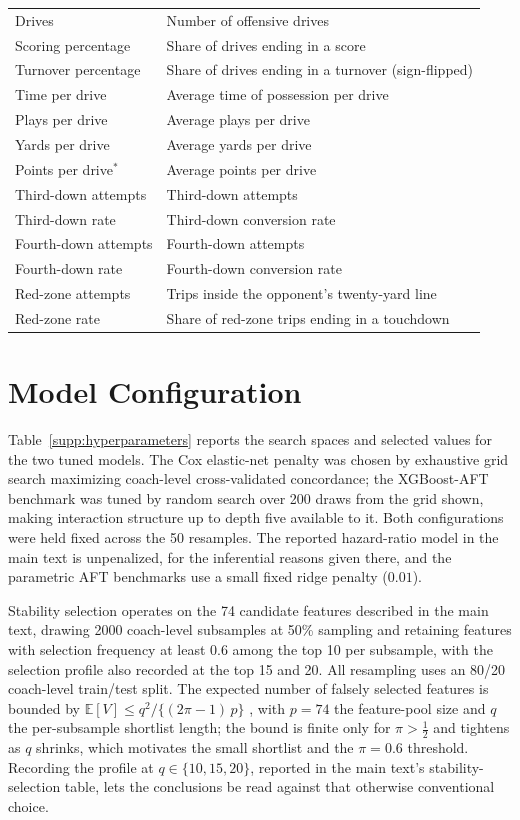 \documentclass[12pt,USenglish]{article}
\begin{document}
{\begin{longtable}{@{}l l@{}}
Drives & Number of offensive drives \\
Scoring percentage & Share of drives ending in a score \\
Turnover percentage & Share of drives ending in a turnover (sign-flipped) \\
Time per drive & Average time of possession per drive \\
Plays per drive & Average plays per drive \\
Yards per drive & Average yards per drive \\
Points per drive$^{\ast}$ & Average points per drive \\
Third-down attempts & Third-down attempts \\
Third-down rate & Third-down conversion rate \\
Fourth-down attempts & Fourth-down attempts \\
Fourth-down rate & Fourth-down conversion rate \\
Red-zone attempts & Trips inside the opponent's twenty-yard line \\
Red-zone rate & Share of red-zone trips ending in a touchdown \\
\end{longtable}
}

\section{Model Configuration}
\label{sec:supp_config}

Table~\ref{supp:hyperparameters} reports the search spaces and selected values for the two tuned models. The Cox elastic-net penalty was chosen by exhaustive grid search maximizing coach-level cross-validated concordance; the XGBoost-AFT benchmark was tuned by random search over 200 draws from the grid shown, making interaction structure up to depth five available to it. Both configurations were held fixed across the 50 resamples. The reported hazard-ratio model in the main text is unpenalized, for the inferential reasons given there, and the parametric AFT benchmarks use a small fixed ridge penalty ($0.01$).

Stability selection operates on the 74 candidate features described in the main text, drawing 2000 coach-level subsamples at 50\% sampling and retaining features with selection frequency at least 0.6 among the top 10 per subsample, with the selection profile also recorded at the top 15 and 20. All resampling uses an 80/20 coach-level train/test split. The expected number of falsely selected features is bounded by $\mathbb{E}[V] \leq q^2 / \{(2\pi - 1)\,p\}$ \citep{meinshausen2010}, with $p = 74$ the feature-pool size and $q$ the per-subsample shortlist length; the bound is finite only for $\pi > \tfrac{1}{2}$ and tightens as $q$ shrinks, which motivates the small shortlist and the $\pi = 0.6$ threshold. Recording the profile at $q \in \{10, 15, 20\}$, reported in the main text's stability-selection table, lets the conclusions be read against that otherwise conventional choice.
\end{document}
